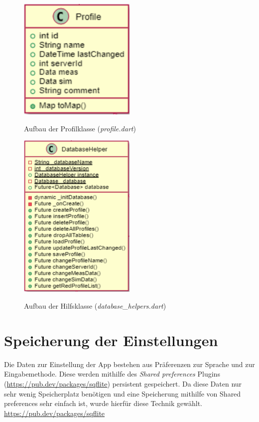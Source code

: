 	\begin{figure}[H]
		\centering
		\includegraphics[width=0.5\textwidth]{../include/images/techdoc/profileClass}
		\label{img:commentTextfield}
		\caption{Aufbau der Profilklasse (\textit{profile.dart})}
	\end{figure}

	\begin{figure}[H]
		\centering
		\includegraphics[width=0.5\textwidth]{../include/images/techdoc/dbHelperClass}
		\label{img:commentTextfield}
		\caption{Aufbau der Hilfsklasse (\textit{database\_helpers.dart})}
	\end{figure}

	
	\section{Speicherung der Einstellungen}
	\label{sec:speicherungEinstellungen}
	
	Die Daten zur Einstellung der App bestehen aus Präferenzen zur Sprache und zur Eingabemethode. Diese werden mithilfe des \textit{Shared preferences} Plugins (\hyperlink{https://pub.dev/packages/sqflite}{https://pub.dev/packages/sqflite}) persistent gespeichert. Da diese Daten nur sehr wenig Speicherplatz benötigen und eine Speicherung mithilfe von Shared preferences sehr einfach ist, wurde hierfür diese Technik gewählt.
	                                                                                                                                                              \hyperlink{https://pub.dev/packages/sqflite}{https://pub.dev/packages/sqflite}
